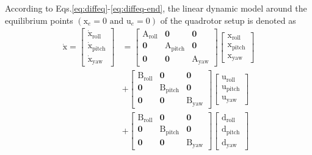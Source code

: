 \documentclass[conference]{IEEEtran}
\begin{document}
According to Eqs.\eqref{eq:diffeq}-\eqref{eq:diffeq-end}, the linear dynamic model around the equilibrium points $(\boldsymbol{{\mathrm{x}}}_e\!=\!0 \text{ and } \boldsymbol{{\mathrm{u}}}_e\!=\!0)$ of the quadrotor setup is denoted as
\begin{equation}
	\begin{split}
		\boldsymbol{{\mathrm{\dot x}}} = \begin{bmatrix}
			\boldsymbol{{\mathrm{\dot x_{\text{roll}}}}}\\
			\boldsymbol{{\mathrm{\dot x_{\text{pitch}}}}}\\
			\boldsymbol{{\mathrm{\dot x_{\text{yaw}}}}}
		\end{bmatrix} &= \begin{bmatrix}
			\boldsymbol{{\mathrm{A_{\text{roll}}}}} & \boldsymbol{0} & \boldsymbol{0}\\
			\boldsymbol{0} & \boldsymbol{{\mathrm{A_{\text{pitch}}}}} & \boldsymbol{0} \\
			\boldsymbol{0} & \boldsymbol{0} & \boldsymbol{{\mathrm{A_{\text{yaw}}}}}
		\end{bmatrix} \begin{bmatrix}
			\boldsymbol{{\mathrm{x_{\text{roll}}}}}\\
			\boldsymbol{{\mathrm{x_{\text{pitch}}}}}\\
			\boldsymbol{{\mathrm{x_{\text{yaw}}}}}
		\end{bmatrix}
		\\[1em]
		& + \begin{bmatrix}
			\boldsymbol{{\mathrm{B_{\text{roll}}}}} & \boldsymbol{0} & \boldsymbol{0}\\
			\boldsymbol{0} & \boldsymbol{{\mathrm{B_{\text{pitch}}}}} & \boldsymbol{0} \\
			\boldsymbol{0} & \boldsymbol{0} & \boldsymbol{{\mathrm{B_{\text{yaw}}}}}
		\end{bmatrix}
		\begin{bmatrix}
			\boldsymbol{{\mathrm{u_{\text{roll}}}}}\\
			\boldsymbol{{\mathrm{u_{\text{pitch}}}}}\\
			\boldsymbol{{\mathrm{u_{\text{yaw}}}}}
		\end{bmatrix}\\[1em]
		& + \begin{bmatrix}
			\boldsymbol{{\mathrm{B_{\text{roll}}}}} & \boldsymbol{0} & \boldsymbol{0}\\
			\boldsymbol{0} & \boldsymbol{{\mathrm{B_{\text{pitch}}}}} & \boldsymbol{0} \\
			\boldsymbol{0} & \boldsymbol{0} & \boldsymbol{{\mathrm{B_{\text{yaw}}}}}
		\end{bmatrix} \begin{bmatrix}
			\boldsymbol{{\mathrm{d_{\text{roll}}}}}\\
			\boldsymbol{{\mathrm{d_{\text{pitch}}}}}\\
			\boldsymbol{{\mathrm{d_{\text{yaw}}}}}
		\end{bmatrix}
	\end{split}
\end{equation}
\end{document}
